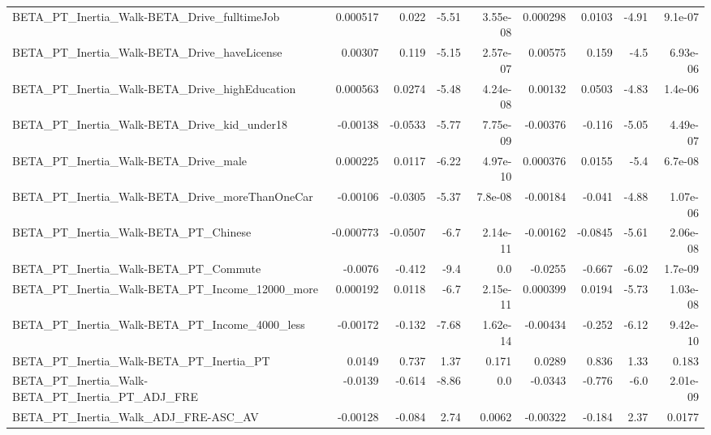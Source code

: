 \begin{tabular}{lrrrrrrrr}
BETA\_PT\_Inertia\_Walk-BETA\_Drive\_fulltimeJob        &    0.000517 &        0.022 &    -5.51 & 3.55e-08 &   0.000298 &      0.0103 &        -4.91 &       9.1e-07 \\
BETA\_PT\_Inertia\_Walk-BETA\_Drive\_haveLicense        &     0.00307 &        0.119 &    -5.15 & 2.57e-07 &    0.00575 &       0.159 &         -4.5 &      6.93e-06 \\
BETA\_PT\_Inertia\_Walk-BETA\_Drive\_highEducation      &    0.000563 &       0.0274 &    -5.48 & 4.24e-08 &    0.00132 &      0.0503 &        -4.83 &       1.4e-06 \\
BETA\_PT\_Inertia\_Walk-BETA\_Drive\_kid\_under18        &    -0.00138 &      -0.0533 &    -5.77 & 7.75e-09 &   -0.00376 &      -0.116 &        -5.05 &      4.49e-07 \\
BETA\_PT\_Inertia\_Walk-BETA\_Drive\_male               &    0.000225 &       0.0117 &    -6.22 & 4.97e-10 &   0.000376 &      0.0155 &         -5.4 &       6.7e-08 \\
BETA\_PT\_Inertia\_Walk-BETA\_Drive\_moreThanOneCar     &    -0.00106 &      -0.0305 &    -5.37 &  7.8e-08 &   -0.00184 &      -0.041 &        -4.88 &      1.07e-06 \\
BETA\_PT\_Inertia\_Walk-BETA\_PT\_Chinese               &   -0.000773 &      -0.0507 &     -6.7 & 2.14e-11 &   -0.00162 &     -0.0845 &        -5.61 &      2.06e-08 \\
BETA\_PT\_Inertia\_Walk-BETA\_PT\_Commute               &     -0.0076 &       -0.412 &     -9.4 &      0.0 &    -0.0255 &      -0.667 &        -6.02 &       1.7e-09 \\
BETA\_PT\_Inertia\_Walk-BETA\_PT\_Income\_12000\_more     &    0.000192 &       0.0118 &     -6.7 & 2.15e-11 &   0.000399 &      0.0194 &        -5.73 &      1.03e-08 \\
BETA\_PT\_Inertia\_Walk-BETA\_PT\_Income\_4000\_less      &    -0.00172 &       -0.132 &    -7.68 & 1.62e-14 &   -0.00434 &      -0.252 &        -6.12 &      9.42e-10 \\
BETA\_PT\_Inertia\_Walk-BETA\_PT\_Inertia\_PT            &      0.0149 &        0.737 &     1.37 &    0.171 &     0.0289 &       0.836 &         1.33 &         0.183 \\
BETA\_PT\_Inertia\_Walk-BETA\_PT\_Inertia\_PT\_ADJ\_FRE    &     -0.0139 &       -0.614 &    -8.86 &      0.0 &    -0.0343 &      -0.776 &         -6.0 &      2.01e-09 \\
BETA\_PT\_Inertia\_Walk\_ADJ\_FRE-ASC\_AV                &    -0.00128 &       -0.084 &     2.74 &   0.0062 &   -0.00322 &      -0.184 &         2.37 &        0.0177 \\

\end{tabular}
